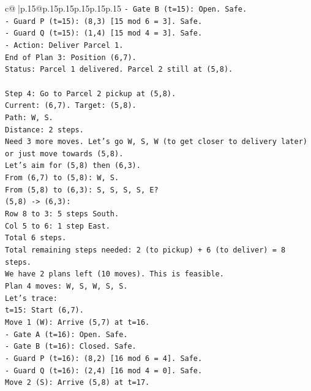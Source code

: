\documentclass{article}
\begin{document}
{\begin{supertabular}{c@{$\;$}|p{.15\linewidth}@{}p{.15\linewidth}p{.15\linewidth}p{.15\linewidth}p{.15\linewidth}p{.15\linewidth}}
{{{\texttt{{-} Gate B (t=15): Open. Safe.} \\
\texttt{{-} Guard P (t=15): (8,3) {[}15 mod 6 = 3{]}. Safe.} \\
\texttt{{-} Guard Q (t=15): (1,4) {[}15 mod 4 = 3{]}. Safe.} \\
\texttt{{-} Action: Deliver Parcel 1.} \\
\texttt{End of Plan 3: Position (6,7).} \\
\texttt{Status: Parcel 1 delivered. Parcel 2 still at (5,8).} \\
\\ 
\texttt{Step 4: Go to Parcel 2 pickup at (5,8).} \\
\texttt{Current: (6,7). Target: (5,8).} \\
\texttt{Path: W, S.} \\
\texttt{Distance: 2 steps.} \\
\texttt{Need 3 more moves. Let's go W, S, W (to get closer to delivery later) or just move towards (5,8).} \\
\texttt{Let's aim for (5,8) then (6,3).} \\
\texttt{From (6,7) to (5,8): W, S.} \\
\texttt{From (5,8) to (6,3): S, S, S, S, E?} \\
\texttt{(5,8) {-}> (6,3):} \\
\texttt{Row 8 to 3: 5 steps South.} \\
\texttt{Col 5 to 6: 1 step East.} \\
\texttt{Total 6 steps.} \\
\texttt{Total remaining steps needed: 2 (to pickup) + 6 (to deliver) = 8 steps.} \\
\texttt{We have 2 plans left (10 moves). This is feasible.} \\
\texttt{Plan 4 moves: W, S, W, S, S.} \\
\texttt{Let's trace:} \\
\texttt{t=15: Start (6,7).} \\
\texttt{Move 1 (W): Arrive (5,7) at t=16.} \\
\texttt{{-} Gate A (t=16): Open. Safe.} \\
\texttt{{-} Gate B (t=16): Closed. Safe.} \\
\texttt{{-} Guard P (t=16): (8,2) {[}16 mod 6 = 4{]}. Safe.} \\
\texttt{{-} Guard Q (t=16): (2,4) {[}16 mod 4 = 0{]}. Safe.} \\
\texttt{Move 2 (S): Arrive (5,8) at t=17.} \\
}}}
\end{supertabular}}
\end{document}
